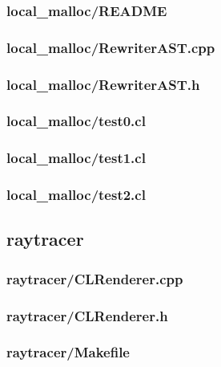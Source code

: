 \documentclass{article}
\begin{document}
\subsubsection*{local\_malloc/README}


\subsubsection*{local\_malloc/RewriterAST.cpp}


\subsubsection*{local\_malloc/RewriterAST.h}


\subsubsection*{local\_malloc/test0.cl}


\subsubsection*{local\_malloc/test1.cl}


\subsubsection*{local\_malloc/test2.cl}


\subsection*{raytracer}
\subsubsection*{raytracer/CLRenderer.cpp}


\subsubsection*{raytracer/CLRenderer.h}


\subsubsection*{raytracer/Makefile}

\end{document}
